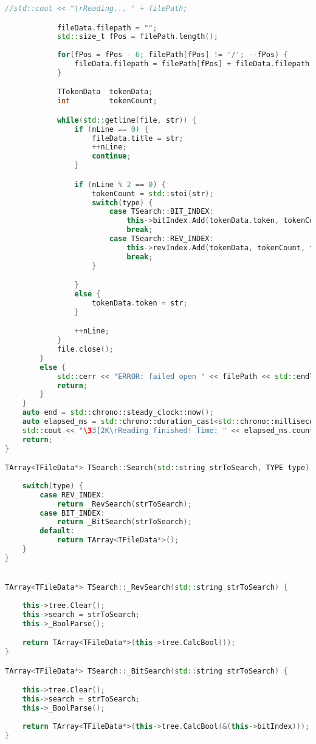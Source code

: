 \begin{lstlisting}[language=C++]
            //std::cout << "\rReading... " + filePath;

            fileData.filepath = "";
            std::size_t fPos = filePath.length();
            
            for(fPos = fPos - 6; filePath[fPos] != '/'; --fPos) {
                fileData.filepath = filePath[fPos] + fileData.filepath;
            }

            TTokenData  tokenData;
            int         tokenCount;

            while(std::getline(file, str)) {
                if (nLine == 0) {
                    fileData.title = str;
                    ++nLine;
                    continue;
                }

                if (nLine % 2 == 0) {
                    tokenCount = std::stoi(str);
                    switch(type) {
                        case TSearch::BIT_INDEX:
                            this->bitIndex.Add(tokenData.token, tokenCount, fileData);
                            break;
                        case TSearch::REV_INDEX:
                            this->revIndex.Add(tokenData, tokenCount, fileData);
                            break;
                    }

                }
                else {
                    tokenData.token = str;
                }

                ++nLine;
            }
            file.close();
        }
        else {
            std::cerr << "ERROR: failed open " << filePath << std::endl;
            return;
        }
    }
    auto end = std::chrono::steady_clock::now();
    auto elapsed_ms = std::chrono::duration_cast<std::chrono::milliseconds>(end - begin);
    std::cout << "\33[2K\rReading finished! Time: " << elapsed_ms.count() << std::endl;
    return;
}

TArray<TFileData*> TSearch::Search(std::string strToSearch, TYPE type) {
    
    switch(type) {
        case REV_INDEX:
            return _RevSearch(strToSearch);
        case BIT_INDEX:
            return _BitSearch(strToSearch);
        default:
            return TArray<TFileData*>();
    }
}


TArray<TFileData*> TSearch::_RevSearch(std::string strToSearch) {
    
    this->tree.Clear();
    this->search = strToSearch;
    this->_BoolParse();

    return TArray<TFileData*>(this->tree.CalcBool());
}

TArray<TFileData*> TSearch::_BitSearch(std::string strToSearch) {

    this->tree.Clear();
    this->search = strToSearch;
    this->_BoolParse();
    
    return TArray<TFileData*>(this->tree.CalcBool(&(this->bitIndex)));
}
\end{lstlisting}